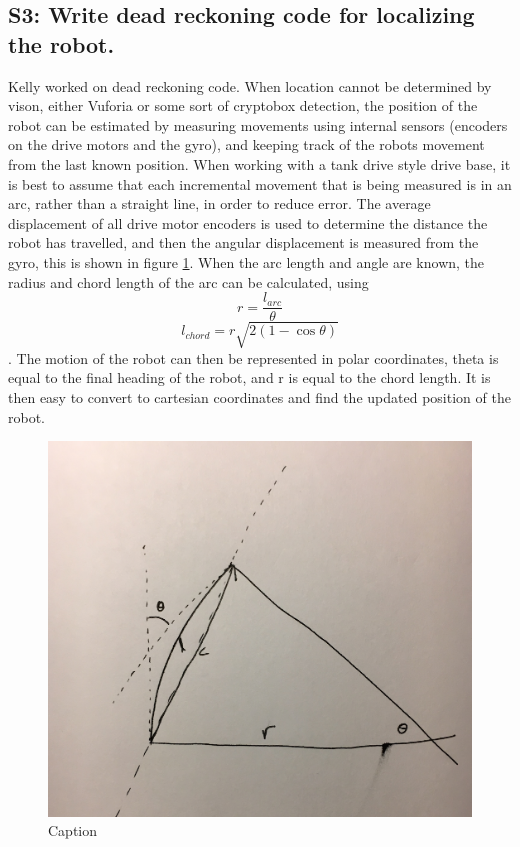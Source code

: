 \documentclass{article}
\begin{document}
\subsection{S3: Write dead reckoning code for localizing the robot.}

Kelly worked on dead reckoning code. When location cannot be determined by vison, either Vuforia or some sort of cryptobox detection, the position of the robot can be estimated by measuring movements using internal sensors (encoders on the drive motors and the gyro), and keeping track of the robots movement from the last known position. When working with a tank drive style drive base, it is best to assume that each incremental movement that is being measured is in an arc, rather than a straight line, in order to reduce error. The average displacement of all drive motor encoders is used to determine the distance the robot has travelled, and then the angular displacement is measured from the gyro, this is shown in figure \ref{fig:twist}. When the arc length and angle are known, the radius and chord length of the arc can be calculated, using $$r=\frac{l_{arc}}{\theta}$$ $$l_{chord} = r \sqrt{2(1-\cos{\theta})}$$. The motion of the robot can then be represented in polar coordinates, theta is equal to the final heading of the robot, and r is equal to the chord length. It is then easy to convert to cartesian coordinates and find the updated position of the robot.
\begin{figure}[h]
    \centering
    \includegraphics[width=.6\textwidth]{02/images/twist.jpg}
    \caption{Caption}
    \label{fig:twist}
\end{figure}
\end{document}

